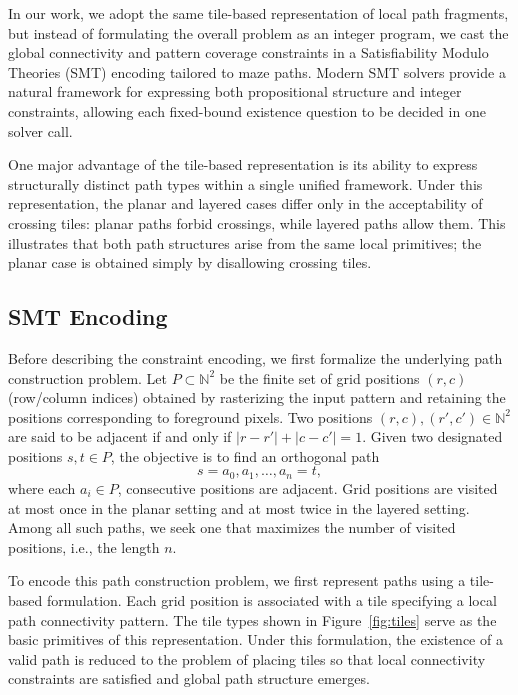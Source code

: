\documentclass[acmsmall,screen,nonacm]{acmart}
\begin{document}
In our work, we adopt the same tile-based representation of local path
fragments, but instead of formulating the overall problem as an
integer program, we cast the global connectivity and pattern coverage
constraints in a Satisfiability Modulo Theories (SMT) encoding
tailored to maze paths. Modern SMT solvers provide a natural framework
for expressing both propositional structure and integer constraints,
allowing each fixed-bound existence question to be decided in one
solver call.

One major advantage of the tile-based representation is its ability to
express structurally distinct path types within a single unified
framework. Under this representation, the planar and layered cases
differ only in the acceptability of crossing tiles: planar paths
forbid crossings, while layered paths allow them. This illustrates
that both path structures arise from the same local primitives; the
planar case is obtained simply by disallowing crossing tiles.

\subsection{SMT Encoding}

Before describing the constraint encoding, we first formalize the
underlying path construction problem. Let \(P \subset \mathbb{N}^2\)
be the finite set of grid positions \((r,c)\) (row/column indices)
obtained by rasterizing the input pattern and retaining the positions
corresponding to foreground pixels. Two positions \((r,c),(r',c') \in
\mathbb{N}^2\) are said to be adjacent if and only if
\(|r-r'|+|c-c'|=1\). Given two designated positions \(s,t \in P\), the
objective is to find an orthogonal path
\[
s = a_0, a_1, \ldots, a_n = t,
\]
where each \(a_i \in P\), consecutive positions are adjacent. Grid
positions are visited at most once in the planar setting and at most
twice in the layered setting. Among all such paths, we seek one that
maximizes the number of visited positions, i.e., the length \(n\).

To encode this path construction problem, we first represent paths
using a tile-based formulation. Each grid position is associated with
a tile specifying a local path connectivity pattern. The tile types
shown in Figure~\ref{fig:tiles} serve as the basic primitives of this
representation. Under this formulation, the existence of a valid path
is reduced to the problem of placing tiles so that local connectivity
constraints are satisfied and global path structure emerges.
\end{document}
